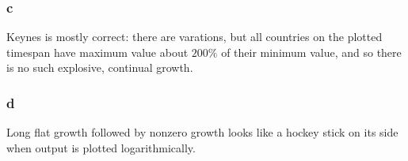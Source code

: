 \documentclass[12pt,letterpaper]{article}
\theoremstyle{definition}
\begin{document}
\subsubsection*{c}

Keynes is mostly correct: there are varations, but all countries on the plotted
timespan have maximum value about $200\%$ of their minimum value, and so there
is no such explosive, continual growth.

\subsubsection*{d}

Long flat growth followed by nonzero growth looks like a hockey stick on its
side when output is plotted logarithmically.
\end{document}
